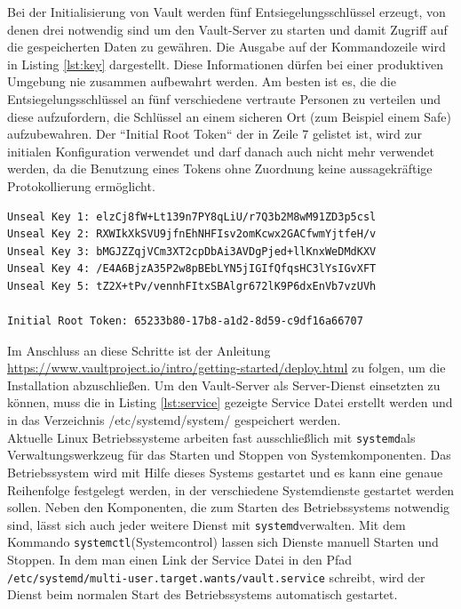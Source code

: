 \documentclass[
book,
a4paper,   
titlepage,  
halfparskip,
12pt        
]{scrartcl}
\newcommand\inline{\lstinline[basicstyle=\ttfamily]}
\begin{document}
\begin{onehalfspacing}
Bei der Initialisierung von Vault werden fünf Entsiegelungsschlüssel erzeugt, von denen drei notwendig sind um den Vault-Server zu starten und damit Zugriff auf die gespeicherten Daten zu gewähren. Die Ausgabe auf der Kommandozeile wird in Listing \vref{lst:key} dargestellt.
Diese Informationen dürfen bei einer produktiven Umgebung nie zusammen aufbewahrt werden. Am besten ist es, die die Entsiegelungsschlüssel an fünf verschiedene vertraute Personen zu verteilen und diese aufzufordern, die Schlüssel an einem sicheren Ort (zum Beispiel einem Safe) aufzubewahren. Der ``Initial Root Token`` der in Zeile 7 gelistet ist, wird zur initialen Konfiguration verwendet und darf danach auch nicht mehr verwendet werden, da die Benutzung eines Tokens ohne Zuordnung keine aussagekräftige Protokollierung ermöglicht.

\begin{lstlisting}[caption={[Initialisierung Vault] Ausgabe der fünf Schlüsselfragmente von denen drei nötig sind um den Hauptschlüssel zu rekonstruieren}, label=lst:key, captionpos=b, basicstyle=\ttfamily]
Unseal Key 1: elzCj8fW+Lt139n7PY8qLiU/r7Q3b2M8wM91ZD3p5csl
Unseal Key 2: RXWIkXkSVU9jfnEhNHFIsv2omKcwx2GACfwmYjtfeH/v
Unseal Key 3: bMGJZZqjVCm3XT2cpDbAi3AVDgPjed+llKnxWeDMdKXV
Unseal Key 4: /E4A6BjzA35P2w8pBEbLYN5jIGIfQfqsHC3lYsIGvXFT
Unseal Key 5: tZ2X+tPv/vennhFItxSBAlgr672lK9P6dxEnVb7vzUVh

Initial Root Token: 65233b80-17b8-a1d2-8d59-c9df16a66707

\end{lstlisting}


Im Anschluss an diese Schritte ist der Anleitung \url{https://www.vaultproject.io/intro/getting-started/deploy.html} zu folgen, um die Installation abzuschließen. Um den Vault-Server als Server-Dienst einsetzten zu können, muss die in Listing \vref{lst:service} gezeigte Service Datei erstellt werden und in das Verzeichnis /etc/systemd/system/ gespeichert werden.\\
Aktuelle Linux Betriebssysteme arbeiten fast ausschließlich mit \inline|systemd|als Verwaltungswerkzeug für das Starten und Stoppen von Systemkomponenten. Das Betriebssystem wird mit Hilfe dieses Systems gestartet und es kann eine genaue Reihenfolge festgelegt werden, in der verschiedene Systemdienste gestartet werden sollen. Neben den Komponenten, die zum Starten des Betriebssystems notwendig sind, lässt sich auch jeder weitere Dienst mit \inline|systemd|verwalten. Mit dem Kommando \inline|systemctl|(Systemcontrol) lassen sich Dienste manuell Starten und Stoppen. In dem man einen Link der Service Datei in den Pfad \inline|/etc/systemd/multi-user.target.wants/vault.service| schreibt, wird der Dienst beim normalen Start des Betriebssystems automatisch gestartet.\cite{systemd}


\end{onehalfspacing}
\end{document}
